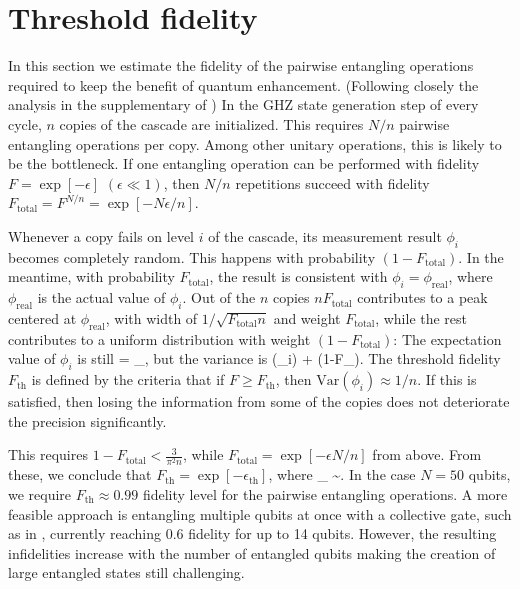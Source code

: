 \section{Threshold fidelity} 
In this section we estimate the fidelity of the pairwise entangling operations
required to keep the benefit of quantum enhancement. (Following closely the
analysis in the supplementary of \cite{Komar2014}) In the GHZ state generation step of
every cycle, $n$ copies of the cascade are initialized. 
This requires $N/n$ pairwise entangling operations per copy.
Among other unitary operations, this is likely to be the bottleneck. If one
 entangling operation can be
performed with fidelity $F = \exp[-\epsilon]$ $(\epsilon \ll 1)$, then $N/n$
repetitions succeed with fidelity $F_\mathrm{total} = F^{N/n}= \exp[-N\epsilon/n
]$.

Whenever a copy fails on level $i$ of the cascade, its measurement result
$\phi_i$ becomes completely random. This happens with probability
$(1-F_\mathrm{total})$.
In the meantime, with probability $F_\mathrm{total}$, the result is consistent with
$\phi_i = \phi_\mathrm{real}$, where $\phi_\mathrm{real}$ is the actual value of
$\phi_i $. Out of the $n$ copies $nF_\mathrm{total}$ contributes to a peak
centered at $\phi_\mathrm{real}$, with width of $1/\sqrt{F_\mathrm{total}n}$ and
weight $F_\mathrm{total}$, while the rest contributes to a uniform distribution
with weight $(1-F_\mathrm{total})$:
The expectation value of $\phi_i$ is still
\bel
 	 = \phi_,
\eel
but the variance is
 \bel
 	(\phi_i) \approx {} +
 	(1-F_).
 \eel 
The threshold fidelity $F_\mathrm{th}$ is defined by the criteria that if $F \geq
F_\mathrm{th}$, then $\mathrm{Var}(\phi_i) \approx 1/n$. If this is satisfied, then
losing the information from some of the copies does not deteriorate
 the precision significantly.

This requires $1-F_\mathrm{total} < \frac{3}{\pi^2 n}$, while
$F_\mathrm{total}= \exp[-\epsilon N/n]$ from above. From these, we conclude that
$F_\mathrm{th} = \exp[-\epsilon_\mathrm{th}]$, where
\bel
	\epsilon_ \approx {} \sim {}.
\eel
In the case $N=50$ qubits, we require
 $F_\mathrm{th} \approx 0.99$ fidelity level for the pairwise entangling
 operations. A more feasible approach is entangling multiple
 qubits at once with a collective gate, such as in \cite{Monz2011},
 currently reaching 0.6 fidelity for up to 14 qubits. However, the resulting
 infidelities  increase with the number of entangled qubits making the
 creation of large entangled states still challenging.
 